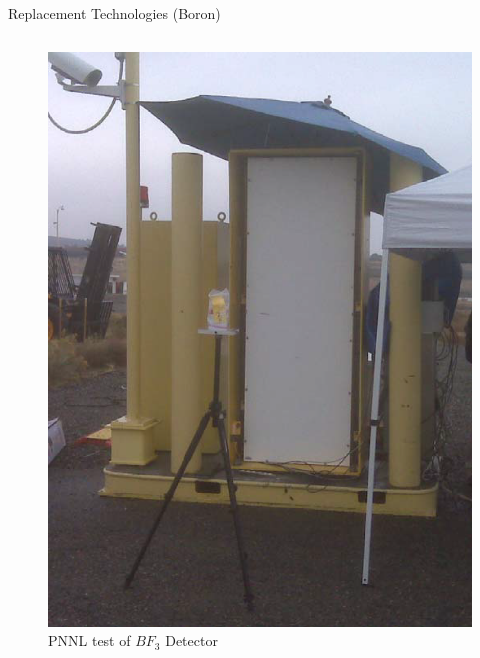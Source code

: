 \begin{frame}{Replacement Technologies (Boron)}
\begin{columns}[onlytextwidth]
\begin{column}{0.45\textwidth}
\begin{figure}
		\includegraphics[height=0.25\textheight]{images/BF3Test.eps}
		\caption{PNNL test of $BF_3$ Detector}
		\label{fig:BF3PNNLTest}
	\end{figure}
\end{column}
\end{columns}
\end{frame}

